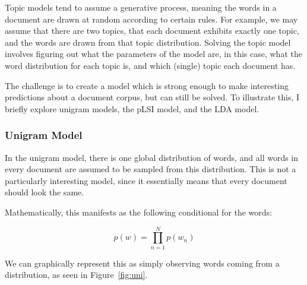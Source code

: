 \documentclass{article}
\begin{document}
Topic models tend to assume a generative process, meaning the words in a document are
drawn at random according to certain rules. For example, we may assume that
there are two topics, that each document exhibits exactly one topic, and the
words are drawn from that topic distribution. Solving the topic model involves
figuring out what the parameters of the model are, in this case, what the word
distribution for each topic is, and which (single) topic each document has.

The challenge is to create a model which is strong enough to make interesting
predictions about a document corpus, but can still be solved. To illustrate
this, I briefly explore unigram models, the pLSI model, and the LDA model.

\subsubsection{Unigram Model}

In the unigram model, there is one global distribution of words, and all words
in every document are assumed to be sampled from this distribution. This is not
a particularly interesting model, since it essentially means that every document
should look the same.

Mathematically, this manifests as the following conditional for the words:

\[
  p(w) = \prod\limits_{n=1}^N p(w_n)
\]

We can graphically represent this as simply observing words coming from a
distribution, as seen in Figure~\ref{fig:uni}.
\end{document}
